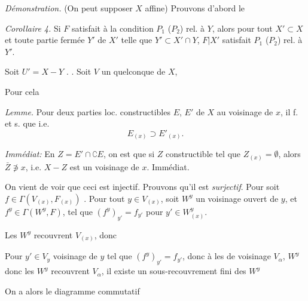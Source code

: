 \documentclass[11pt,a4paper]{article}
\begin{document}
\emph{Démonstration.} (On peut supposer $X$ affine) \struck{\ill{}} Prouvons d'abord le

\emph{Corollaire 4.} Si $F$ satisfait à la condition $P_1$ ($P_2$) rel. à $Y$, alors pour tout  \ill{} $X' \subset X$ et toute partie fermée $Y'$ de $X'$ telle que $Y' \subset X' \cap Y$, $F|X'$ satisfait $P_1$ ($P_2$) rel. à $Y'$.


Soit $U' = X - Y$ . \ill{} . Soit $V$ un \ill{} quelconque de $X$,

Pour cela \ill{}

\emph{Lemme.} Pour deux parties loc. constructibles  $E$, $E'$ de $X$ \struck{\ill{}} au voisinage de $x$, il f. et s. que \ill{}  \ill{} i.e.
\[
  E_{(x)} \supset E'_{(x)} .
\]

\emph{Immédiat:} En $Z = E' \cap \complement E$, on est \ill{} \ill{} que si $Z$ constructible \ill{} tel que $Z_{(x)} = \emptyset$, alors $\bar{Z} \not\ni x$, i.e. $X - Z$ est un voisinage de $x$. Immédiat.

On vient de voir que ceci est injectif. Prouvons qu'il est \emph{surjectif}.  Pour \ill{} soit $f \in \Gamma(V_{(x)}, F_{(x)})$ . Pour tout $y \in V_{(x)}$, soit $W^y$ un voisinage ouvert de $y$, et \ill{} $f^y \in \Gamma(W^y,F)$, tel que $(f^y)_{y'} = f_{y'}$ pour $y' \in W^y_{(x)}$.


Les $W^y$ recouvrent $V_{(x)}$, donc \ill{} 

\ill{} Pour $y' \in V_y$ voisinage de $y$ \ill{} \ill{} tel que $(f^y)_{y'} = f_{y'}$, donc \ill{} à \ill{} les \ill{} de voisinage \ill{} $V_{\alpha}$, $W^y$ \ill{} \ill{} \ill{} donc les $W^y$ recouvrent $V_{\alpha}$, \ill{} \ill{} il existe un sous-recouvrement fini des $W^y$ \ill{} \ill{}

On a alors le diagramme commutatif

\end{document}
